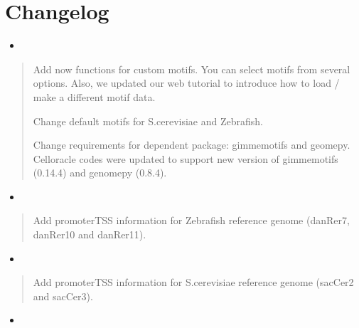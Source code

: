 \documentclass[letterpaper,10pt,english]{sphinxmanual}
\begin{document}
\section{Changelog}
\label{\detokenize{changelog/index:changelog}}\label{\detokenize{changelog/index:id1}}\label{\detokenize{changelog/index::doc}}\begin{itemize}
\item {} 

\end{itemize}
\begin{quote}

\sphinxtitleref{\sphinxhyphen{}} Add now functions for custom motifs. You can select motifs from several options. Also, we updated our web tutorial to introduce how to load / make a different motif data.

\sphinxtitleref{\sphinxhyphen{}} Change default motifs for S.cerevisiae and Zebrafish.

\sphinxtitleref{\sphinxhyphen{}} Change requirements for dependent package: gimmemotifs and geomepy. Celloracle codes were updated to support new version of gimmemotifs (0.14.4) and genomepy (0.8.4).
\end{quote}
\begin{itemize}
\item {} 

\end{itemize}
\begin{quote}

\sphinxtitleref{\sphinxhyphen{}} Add promoter\sphinxhyphen{}TSS information for Zebrafish reference genome (danRer7, danRer10 and danRer11).
\end{quote}
\begin{itemize}
\item {} 

\end{itemize}
\begin{quote}

\sphinxtitleref{\sphinxhyphen{}} Add promoter\sphinxhyphen{}TSS information for S.cerevisiae reference genome (sacCer2 and sacCer3).
\end{quote}
\begin{itemize}
\item {} 

\end{itemize}
\end{document}
